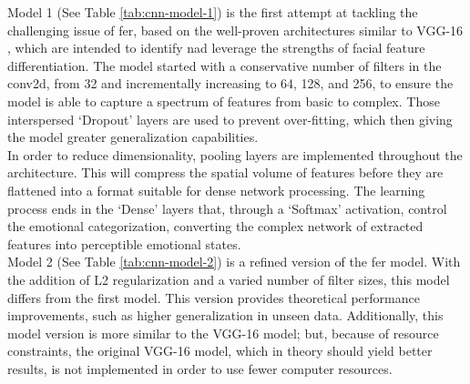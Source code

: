 \newpage
\indent Model 1 (See Table \ref{tab:cnn-model-1}) is the first attempt at tackling the challenging issue of \gls{fer}, based on the well-proven architectures similar to VGG-16 \citep{simonyan2015deep}, which are intended to identify nad leverage the strengths of facial feature differentiation.
The model started with a conservative number of filters in the \gls{conv2d}, from 32 and incrementally increasing to 64, 128, and 256, to ensure the model is able to capture a spectrum of features from basic to complex. 
Those interspersed `Dropout' layers are used to prevent over-fitting, which then giving the model greater generalization capabilities.
\\
\indent In order to reduce dimensionality, pooling layers are implemented throughout the architecture.
This will compress the spatial volume of features before they are flattened into a format suitable for dense network processing.
The learning process ends in the `Dense' layers that, through a `Softmax' activation, control the emotional categorization, converting the complex network of extracted features into perceptible emotional states.
\\
\indent Model 2 (See Table \ref{tab:cnn-model-2}) is a refined version of the \gls{fer} model.
With the addition of L2 regularization and a varied number of filter sizes, this model differs from the first model.
This version provides theoretical performance improvements, such as higher generalization in unseen data.
Additionally, this model version is more similar to the VGG-16 model; but, because of resource constraints, the original VGG-16 model, which in theory should yield better results, is not implemented in order to use fewer computer resources.
